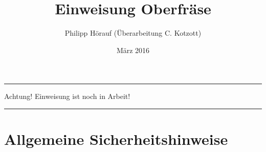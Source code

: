\documentclass{\basedir/fablab-document}
\date{März 2016}
\author{Philipp Hörauf (Überarbeitung C. Kotzott)}
\title{Einweisung Oberfräse}
\begin{document}
\dosecttoc
\faketableofcontents
{}

\color{red}
\hrule
\begin{center}
\large{Achtung! Einweisung ist noch in Arbeit!}
\vspace{0.1cm}
\end{center}
\hrule
\color{black}

\section[Allgemeine Sicherheitshinweise]{Allgemeine Sicherheitshinweise}
\end{document}
